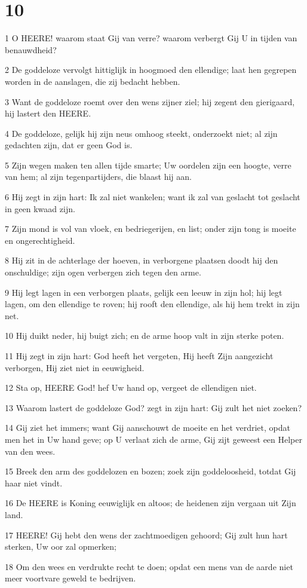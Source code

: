 \chapter{10}

\par 1 O HEERE! waarom staat Gij van verre? waarom verbergt Gij U in tijden van benauwdheid?
\par 2 De goddeloze vervolgt hittiglijk in hoogmoed den ellendige; laat hen gegrepen worden in de aanslagen, die zij bedacht hebben.
\par 3 Want de goddeloze roemt over den wens zijner ziel; hij zegent den gierigaard, hij lastert den HEERE.
\par 4 De goddeloze, gelijk hij zijn neus omhoog steekt, onderzoekt niet; al zijn gedachten zijn, dat er geen God is.
\par 5 Zijn wegen maken ten allen tijde smarte; Uw oordelen zijn een hoogte, verre van hem; al zijn tegenpartijders, die blaast hij aan.
\par 6 Hij zegt in zijn hart: Ik zal niet wankelen; want ik zal van geslacht tot geslacht in geen kwaad zijn.
\par 7 Zijn mond is vol van vloek, en bedriegerijen, en list; onder zijn tong is moeite en ongerechtigheid.
\par 8 Hij zit in de achterlage der hoeven, in verborgene plaatsen doodt hij den onschuldige; zijn ogen verbergen zich tegen den arme.
\par 9 Hij legt lagen in een verborgen plaats, gelijk een leeuw in zijn hol; hij legt lagen, om den ellendige te roven; hij rooft den ellendige, als hij hem trekt in zijn net.
\par 10 Hij duikt neder, hij buigt zich; en de arme hoop valt in zijn sterke poten.
\par 11 Hij zegt in zijn hart: God heeft het vergeten, Hij heeft Zijn aangezicht verborgen, Hij ziet niet in eeuwigheid.
\par 12 Sta op, HEERE God! hef Uw hand op, vergeet de ellendigen niet.
\par 13 Waarom lastert de goddeloze God? zegt in zijn hart: Gij zult het niet zoeken?
\par 14 Gij ziet het immers; want Gij aanschouwt de moeite en het verdriet, opdat men het in Uw hand geve; op U verlaat zich de arme, Gij zijt geweest een Helper van den wees.
\par 15 Breek den arm des goddelozen en bozen; zoek zijn goddeloosheid, totdat Gij haar niet vindt.
\par 16 De HEERE is Koning eeuwiglijk en altoos; de heidenen zijn vergaan uit Zijn land.
\par 17 HEERE! Gij hebt den wens der zachtmoedigen gehoord; Gij zult hun hart sterken, Uw oor zal opmerken;
\par 18 Om den wees en verdrukte recht te doen; opdat een mens van de aarde niet meer voortvare geweld te bedrijven.

